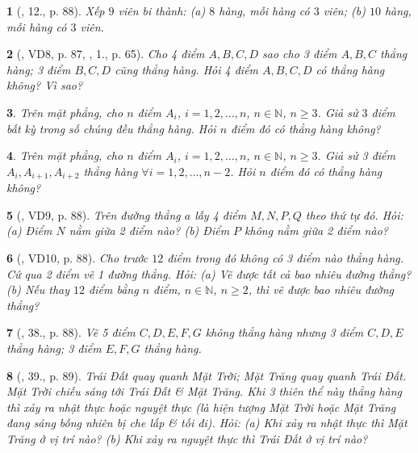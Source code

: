 \documentclass{article}
\newtheorem{baitoan}{}
\begin{document}
\begin{baitoan}[\cite{SBT_Toan_6_Canh_Dieu_tap_2}, 12., p. 88]
	Xếp $9$ viên bi thành: (a) $8$ hàng, mỗi hàng có $3$ viên; (b) $10$ hàng, mỗi hàng có $3$ viên.
\end{baitoan}

\begin{baitoan}[\cite{Tuyen_Toan_6}, VD8, p. 87, \cite{Binh_Toan_6_tap_2}, 1., p. 65]
	Cho 4 điểm $A,B,C,D$ sao cho 3 điểm $A,B,C$ thẳng hàng; 3 điểm $B,C,D$ cũng thẳng hàng. Hỏi 4 điểm $A,B,C,D$ có thẳng hàng không? Vì sao?
\end{baitoan}

\begin{baitoan}
	Trên mặt phẳng, cho $n$ điểm $A_i$, $i = 1,2,\ldots,n$, $n\in\mathbb{N}$, $n\ge3$. Giả sử $3$ điểm bất kỳ trong số chúng đều thẳng hàng. Hỏi $n$ điểm đó có thẳng hàng không?
\end{baitoan}

\begin{baitoan}
	Trên mặt phẳng, cho $n$ điểm $A_i$, $i = 1,2,\ldots,n$, $n\in\mathbb{N}$, $n\ge3$. Giả sử 3 điểm $A_i,A_{i+1},A_{i+2}$ thẳng hàng $\forall i = 1,2,\ldots,n-2$. Hỏi $n$ điểm đó có thẳng hàng không?
\end{baitoan}

\begin{baitoan}[\cite{Tuyen_Toan_6}, VD9, p. 88]
	Trên đường thẳng $a$ lấy 4 điểm $M,N,P,Q$ theo thứ tự đó. Hỏi: (a) Điểm $N$ nằm giữa 2 điểm nào? (b) Điểm $P$ không nằm giữa 2 điểm nào?
\end{baitoan}

\begin{baitoan}[\cite{Tuyen_Toan_6}, VD10, p. 88]
	Cho trước $12$ điểm trong đó không có 3 điểm nào thẳng hàng. Cứ qua 2 điểm vẽ 1 đường thẳng. Hỏi: (a) Vẽ được tất cả bao nhiêu đường thẳng? (b) Nếu thay $12$ điểm bằng $n$ điểm, $n\in\mathbb{N}$, $n\ge2$, thì vẽ được bao nhiêu đường thẳng?
\end{baitoan}

\begin{baitoan}[\cite{Tuyen_Toan_6}, 38., p. 88]
	Vẽ 5 điểm $C,D,E,F,G$ không thẳng hàng nhưng 3 điểm $C,D,E$ thẳng hàng; 3 điểm $E,F,G$ thẳng hàng.
\end{baitoan}

\begin{baitoan}[\cite{Tuyen_Toan_6}, 39., p. 89]
	Trái Đất quay quanh Mặt Trời; Mặt Trăng quay quanh Trái Đất. Mặt Trời chiếu sáng tới Trái Đất \& Mặt Trăng. Khi 3 thiên thể này thẳng hàng thì xảy ra nhật thực hoặc nguyệt thực (là hiện tượng Mặt Trời hoặc Mặt Trăng đang sáng bỗng nhiên bị che lấp \& tối đi). Hỏi: (a) Khi xảy ra nhật thực thì Mặt Trăng ở vị trí nào? (b) Khi xảy ra nguyệt thực thì Trái Đất ở vị trí nào?
\end{baitoan}
\end{document}

